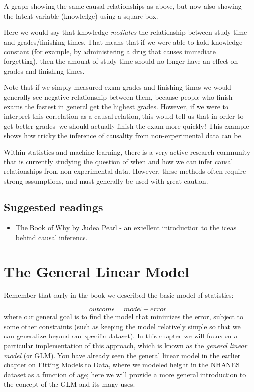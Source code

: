 \documentclass[]{book}
\providecommand{\tightlist}{%
  \setlength{\itemsep}{0pt}\setlength{\parskip}{0pt}}
\theoremstyle{definition}
\theoremstyle{definition}
\theoremstyle{definition}
\theoremstyle{remark}
\begin{document}
\label{fig:latentCausalGraph}A graph showing the same causal relationships
as above, but now also showing the latent variable (knowledge) using a
square box.

Here we would say that knowledge \emph{mediates} the relationship
between study time and grades/finishing times. That means that if we
were able to hold knowledge constant (for example, by administering a
drug that causes immediate forgetting), then the amount of study time
should no longer have an effect on grades and finishing times.

Note that if we simply measured exam grades and finishing times we would
generally see negative relationship between them, because people who
finish exams the fastest in general get the highest grades. However, if
we were to interpret this correlation as a causal relation, this would
tell us that in order to get better grades, we should actually finish
the exam more quickly! This example shows how tricky the inference of
causality from non-experimental data can be.

Within statistics and machine learning, there is a very active research
community that is currently studying the question of when and how we can
infer causal relationships from non-experimental data. However, these
methods often require strong assumptions, and must generally be used
with great caution.

\section{Suggested readings}\label{suggested-readings-9}

\begin{itemize}
\tightlist
\item
  \href{http://bayes.cs.ucla.edu/WHY/}{The Book of Why} by Judea Pearl -
  an excellent introduction to the ideas behind causal inference.
\end{itemize}

\chapter{The General Linear Model}\label{the-general-linear-model}

Remember that early in the book we described the basic model of
statistics:

\[
outcome = model + error
\] where our general goal is to find the model that minimizes the error,
subject to some other constraints (such as keeping the model relatively
simple so that we can generalize beyond our specific dataset). In this
chapter we will focus on a particular implementation of this approach,
which is known as the \emph{general linear model} (or GLM). You have
already seen the general linear model in the earlier chapter on Fitting
Models to Data, where we modeled height in the NHANES dataset as a
function of age; here we will provide a more general introduction to the
concept of the GLM and its many uses.
\end{document}
